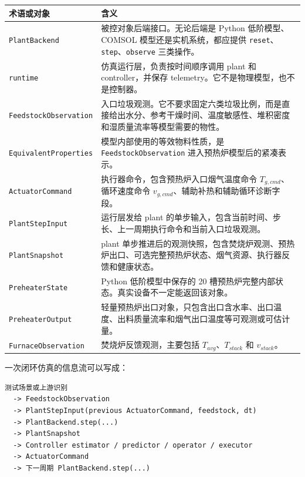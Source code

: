 \documentclass[UTF8,openany,zihao=-4,oneside]{ctexbook}
\providecommand{\passthrough}[1]{#1}
\begin{document}
\begin{longtable}[]{@{}
  >{\raggedright\arraybackslash}p{}
  >{\raggedright\arraybackslash}p{}@{}}
\toprule
术语或对象 & 含义 \\
\midrule
\endhead
\bottomrule
\endlastfoot
\passthrough{\lstinline!PlantBackend!} & 被控对象后端接口。无论后端是 Python 低阶模型、COMSOL 模型还是实机系统，都应提供 \passthrough{\lstinline!reset!}、\passthrough{\lstinline!step!}、\passthrough{\lstinline!observe!} 三类操作。 \\
\passthrough{\lstinline!runtime!} & 仿真运行层，负责按时间顺序调用 plant 和 controller，并保存 telemetry。它不是物理模型，也不是控制器。 \\
\passthrough{\lstinline!FeedstockObservation!} & 入口垃圾观测。它不要求固定六类垃圾比例，而是直接给出水分、参考干燥时间、温度敏感性、堆积密度和湿质量流率等模型需要的物性。 \\
\passthrough{\lstinline!EquivalentProperties!} & 模型内部使用的等效物料性质，是 \passthrough{\lstinline!FeedstockObservation!} 进入预热炉模型后的紧凑表示。 \\
\passthrough{\lstinline!ActuatorCommand!} & 执行器命令，包含预热炉入口烟气温度命令 \(T_{g,cmd}\)、循环速度命令 \(v_{g,cmd}\)、辅助补热和辅助循环诊断字段。 \\
\passthrough{\lstinline!PlantStepInput!} & 运行层发给 plant 的单步输入，包含当前时间、步长、上一周期执行命令和当前入口垃圾观测。 \\
\passthrough{\lstinline!PlantSnapshot!} & plant 单步推进后的观测快照，包含焚烧炉观测、预热炉出口、可选完整预热炉状态、烟气资源、执行器反馈和健康状态。 \\
\passthrough{\lstinline!PreheaterState!} & Python 低阶模型中保存的 20 槽预热炉完整内部状态。真实设备不一定能返回该对象。 \\
\passthrough{\lstinline!PreheaterOutput!} & 轻量预热炉出口对象，只包含出口含水率、出口温度、出料质量流率和烟气出口温度等可观测或可估计量。 \\
\passthrough{\lstinline!FurnaceObservation!} & 焚烧炉反馈观测，主要包括 \(T_{avg}\)、\(T_{stack}\) 和 \(v_{stack}\)。 \\
\end{longtable}

一次闭环仿真的信息流可以写成：

\begin{lstlisting}
测试场景或上游识别
  -> FeedstockObservation
  -> PlantStepInput(previous ActuatorCommand, feedstock, dt)
  -> PlantBackend.step(...)
  -> PlantSnapshot
  -> Controller estimator / predictor / operator / executor
  -> ActuatorCommand
  -> 下一周期 PlantBackend.step(...)
\end{lstlisting}
\end{document}
